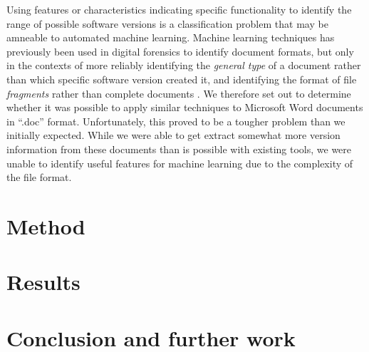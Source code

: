 \documentclass[12pt]{article}
\begin{document}
Using features or characteristics indicating specific functionality to identify the range of possible software versions is a classification problem that may be amneable to automated machine learning. Machine learning techniques has previously been used in digital forensics to identify document formats, but only in the contexts of more reliably identifying the \emph{general type} of a document \cite{Mokhov.S-2008a-File} rather than which specific software version created it, and identifying the format of file \emph{fragments} rather than complete documents \cite{Li.Q-2010a-SVM,Roussev.V-2009a-File}. We therefore set out to determine whether it was possible to apply similar techniques to Microsoft Word documents in “.doc” format. Unfortunately, this proved to be a tougher problem than we initially expected. While we were able to get extract somewhat more version information from these documents than is possible with existing tools, we were unable to identify useful features for machine learning due to the complexity of the file format.


\section{Method}


\section{Results}


\section{Conclusion and further work}




\end{document}
